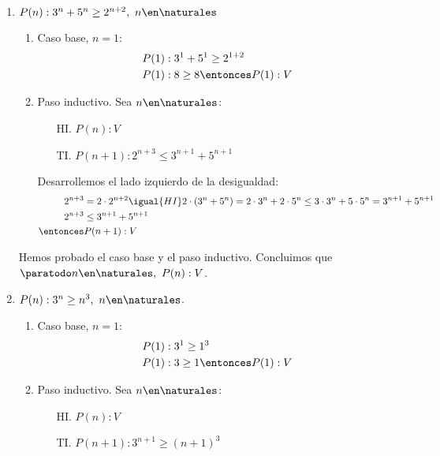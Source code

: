 \begin{enumerate}[label=\roman*)]
  \item $P(n): 3^n + 5^n \geq 2^{n+2},\ n \en \naturales$
        \begin{enumerate}[label=\arabic*)]
          \item Caso base, $n = 1$:
                \begin{align*}
                  P(1) & : 3^1 + 5^1 \geq 2^{1+2}    \\
                  P(1) & : 8 \geq 8 \entonces P(1): V
                \end{align*}
          \item Paso inductivo. Sea $n \en \naturales$:
                \begin{enumerate}
                  \item[HI.] $P(n): V$
                  \item[TI.] $P(n+1): 2^{n+3} \leq 3^{n+1} + 5^{n+1}$
                \end{enumerate}

                Desarrollemos el lado izquierdo de la desigualdad:
                \begin{align*}
                  2^{n+3}  & = 2 \cdot 2^{n+2} \igual{HI} 2 \cdot (3^n + 5^n) = 2 \cdot 3^n + 2 \cdot 5^n \leq
                  3 \cdot 3^n + 5 \cdot 5^n = 3^{n+1} + 5^{n+1}                                                     \\
                  2^{n+3}  & \leq 3^{n+1} + 5^{n+1}                                                                 \\
                  \entonces & P(n+1): V
                \end{align*}
        \end{enumerate}

        Hemos probado el caso base y el paso inductivo. Concluimos que $\paratodo n \en \naturales, \ P(n): V$.


  \item $P(n): 3^n \geq n^3, \ n \en \naturales$.
        \begin{enumerate}[label=\arabic*)]
          \item Caso base, $n = 1$:
                \begin{align*}
                  P(1) & : 3^1 \geq 1^3              \\
                  P(1) & : 3 \geq 1 \entonces P(1): V
                \end{align*}
          \item Paso inductivo. Sea $n \en \naturales$:
                \begin{enumerate}
                  \item[HI.] $P(n): V$
                  \item[TI.] $P(n+1): 3^{n+1} \geq (n+1)^3$
                \end{enumerate}


\end{enumerate}
\end{enumerate}
